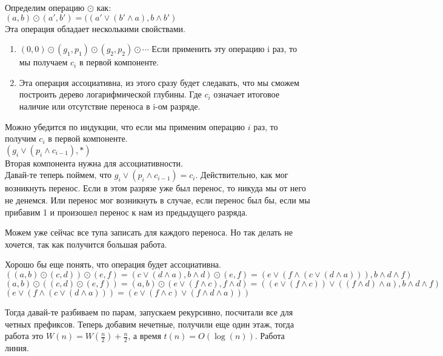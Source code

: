 Определим операцию $\odot$ как:\\
$(a, b) \odot (a', b') = ((a' \vee (b' \wedge a), b \wedge b')$\\

Эта операция обладает несколькими свойствами. 
 
\begin{enumerate}
	\item $(0, 0) \odot (g_1, p_1) \odot (g_2, p_2) \odot \cdots$
	Если применить эту операцию i раз, то мы получаем $c_i$ в первой компоненте.
	\item Эта операция ассоциативна, из этого сразу будет следавать, что мы 
	сможем построить дерево логарифмической глубины. Где $c_i$ означает итоговое наличие или отсутствие переноса в i-ом разряде.
\end{enumerate}

Можно убедится по индукции, что если мы применим операцию $i$ раз, то получим $c_i$ в первой компоненте.\\
$(g_i \vee (p_i \wedge c_{i - 1}), *)$\\
Вторая компонента нужна для ассоциативности.\\

Давай-те теперь поймем, что $g_i \vee (p_i \wedge c_{i - 1}) = c_i$. Действительно, как мог возникнуть перенос. 
Если в этом разрязе уже был перенос, то никуда мы от него не денемся. Или перенос мог возникнуть в случае, если перенос 
был бы, если мы прибавим 1 и произошел перенос к нам из предыдущего разряда.

Можем уже сейчас все тупа записать для каждого переноса. Но так делать не хочется, 
так как получится большая работа. 

Хорошо бы еще понять, что операция будет ассоциативна. 
$((a, b) \odot (c, d)) \odot (e, f) = (c \vee (d \wedge a), b \wedge d) \odot (e, f) = (e \vee (f \wedge (c \vee (d \wedge a))), b \wedge d \wedge f)$\\
$(a, b) \odot ((c, d) \odot (e, f)) = (a, b) \odot (e \vee (f \wedge c), f \wedge d) = ((e \vee (f \wedge c)) \vee ((f \wedge d) \wedge a), b \wedge d \wedge f)$\\
$(e \vee (f \wedge (c \vee (d \wedge a))) = (e \vee (f \wedge c) \vee (f \wedge d \wedge a)))$

Тогда давай-те разбиваем по парам, запускаем рекурсивно, посчитали все для четных префиксов. 
Теперь добавим нечетные, получили еще один этаж, тогда работа это $W(n) = W(\frac{n}{2}) + \frac{n}{2}$, а время $t(n) = O(\log (n))$. 
Работа линия.

